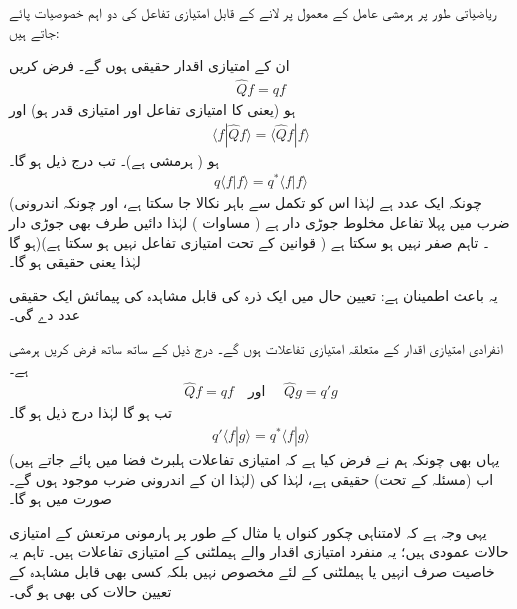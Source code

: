 ریاضیاتی طور پر ہرمشی عامل کے معمول پر لانے کے قابل امتیازی تفاعل کی دو اہم خصوصیات پائے جاتے ہیں:
 
ان کے امتیازی اقدار حقیقی ہوں گے۔ 
 فرض کریں
\begin{align*}
\hat{Q}f = qf 
\end{align*}
ہو (یعنی  کا امتیازی تفاعل  اور امتیازی قدر  ہو) اور 
\begin{align*}
\langle f | \hat{Q} f \rangle = \langle \hat{Q} f | f \rangle
\end{align*}
ہو ( ہرمشی ہے)۔ تب درج ذیل ہو گا۔
\begin{align*}
q\langle f \left\vert f \right. \rangle = q^{*} \langle f \left\vert f \right. \rangle
\end{align*}
(چونکہ  ایک عدد ہے لہٰذا اس کو تکمل سے باہر نکالا جا سکتا ہے، اور چونکہ اندرونی ضرب میں پہلا تفاعل مخلوط جوڑی دار ہے ( مساوات  ) لہٰذا دائیں طرف  بھی جوڑی دار ہو گا)۔ تاہم  صفر نہیں ہو سکتا ہے ( قوانین کے تحت  امتیازی تفاعل نہیں ہو سکتا ہے) لہٰذا  یعنی  حقیقی ہو گا۔

 یہ باعث اطمینان ہے: تعیین حال میں ایک ذرہ کی قابل مشاہدہ کی پیمائش ایک حقیقی عدد دے گی۔ 
 
انفرادی امتیازی اقدار کے متعلقہ امتیازی تفاعلات  ہوں گے۔ 
درج ذیل کے ساتھ ساتھ فرض کریں  ہرمشی ہے۔
\begin{align*}
\hat{Q}f = qf \quad \text{اور }\quad \hat{Q}g=q'g
\end{align*}
 تب  ہو گا لہٰذا درج ذیل ہو گا۔
\begin{align*}
q' \langle f | g \rangle = q^{*} \langle f | g \rangle
\end{align*}
(یہاں بھی چونکہ ہم نے فرض کیا ہے کہ امتیازی تفاعلات ہلبرٹ فضا میں پائے جاتے ہیں لہٰذا ان کے اندرونی ضرب موجود ہوں گے۔) اب (مسئلہ  کے تحت)  حقیقی ہے، لہٰذا  کی صورت میں  ہو گا۔ 

یہی وجہ ہے کہ لامتناہی چکور کنواں یا مثال کے طور پر ہارمونی مرتعش کے امتیازی حالات عمودی ہیں؛ یہ منفرد امتیازی اقدار والے ہیملٹنی کے امتیازی تفاعلات ہیں۔ تاہم یہ خاصیت صرف انہیں یا ہیملٹنی کے لئے مخصوص نہیں بلکہ کسی بھی قابل مشاہدہ کے تعیین حالات کی بھی ہو گی۔

